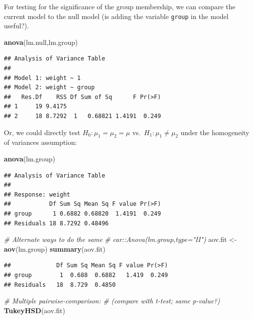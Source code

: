 \documentclass[
]{book}
\newenvironment{Shaded}{\begin{snugshade}}{\end{snugshade}}
\newcommand{\CommentTok}[1]{\textcolor[rgb]{0.56,0.35,0.01}{\textit{#1}}}
\newcommand{\KeywordTok}[1]{\textcolor[rgb]{0.13,0.29,0.53}{\textbf{#1}}}
\newcommand{\NormalTok}[1]{#1}
\newcommand{\StringTok}[1]{\textcolor[rgb]{0.31,0.60,0.02}{#1}}
\begin{document}
For testing for the significance of the group membership, we can compare the current model to the null model (is adding the variable \texttt{group} in the model useful?).

\begin{Shaded}
\begin{Highlighting}[]
\KeywordTok{anova}\NormalTok{(lm.null,lm.group)}
\end{Highlighting}
\end{Shaded}

\begin{verbatim}
## Analysis of Variance Table
## 
## Model 1: weight ~ 1
## Model 2: weight ~ group
##   Res.Df    RSS Df Sum of Sq      F Pr(>F)
## 1     19 9.4175                           
## 2     18 8.7292  1   0.68821 1.4191  0.249
\end{verbatim}

Or, we could directly test \(H_0 : \mu_1 = \mu_2 = \mu\) vs.~\(H_1 : \mu_1 \ne \mu_2\) under the homogeneity of variances assumption:

\begin{Shaded}
\begin{Highlighting}[]
\KeywordTok{anova}\NormalTok{(lm.group)}
\end{Highlighting}
\end{Shaded}

\begin{verbatim}
## Analysis of Variance Table
## 
## Response: weight
##           Df Sum Sq Mean Sq F value Pr(>F)
## group      1 0.6882 0.68820  1.4191  0.249
## Residuals 18 8.7292 0.48496
\end{verbatim}

\begin{Shaded}
\begin{Highlighting}[]
\CommentTok{# Alternate ways to do the same}
\CommentTok{# car::Anova(lm.group,type="II")}
\NormalTok{aov.fit <-}\StringTok{ }\KeywordTok{aov}\NormalTok{(lm.group)}
\KeywordTok{summary}\NormalTok{(aov.fit)}
\end{Highlighting}
\end{Shaded}

\begin{verbatim}
##             Df Sum Sq Mean Sq F value Pr(>F)
## group        1  0.688  0.6882   1.419  0.249
## Residuals   18  8.729  0.4850
\end{verbatim}

\begin{Shaded}
\begin{Highlighting}[]
\CommentTok{# Multiple pairwise-comparison: }
\CommentTok{# (compare with t-test; same p-value?)}
\KeywordTok{TukeyHSD}\NormalTok{(aov.fit) }
\end{Highlighting}
\end{Shaded}
\end{document}
